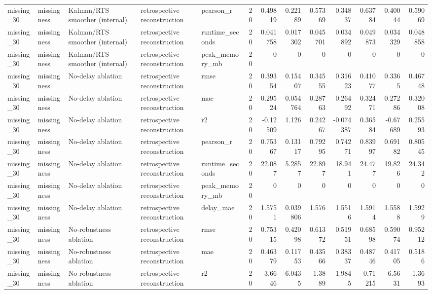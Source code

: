 \begin{table}[!htbp]
{{\begin{tabular}{lllllrrrrrrrr}
missing_30 & missingness & Kalman/RTS smoother (internal) & retrospective reconstruction & pearson_r & 20 & 0.49819 & 0.22189 & 0.57369 & 0.34837 & 0.63784 & 0.40044 & 0.59069 \\
missing_30 & missingness & Kalman/RTS smoother (internal) & retrospective reconstruction & runtime_seconds & 20 & 0.041758 & 0.017302 & 0.045701 & 0.034892 & 0.049873 & 0.034329 & 0.048858 \\
missing_30 & missingness & Kalman/RTS smoother (internal) & retrospective reconstruction & peak_memory_mb & 20 & 0 & 0 & 0 & 0 & 0 & 0 & 0 \\
missing_30 & missingness & No-delay ablation & retrospective reconstruction & rmse & 20 & 0.39354 & 0.15407 & 0.34555 & 0.31623 & 0.41077 & 0.3365 & 0.46748 \\
missing_30 & missingness & No-delay ablation & retrospective reconstruction & mae & 20 & 0.29524 & 0.054764 & 0.28763 & 0.26492 & 0.32471 & 0.27286 & 0.32008 \\
missing_30 & missingness & No-delay ablation & retrospective reconstruction & r2 & 20 & -0.12509 & 1.126 & 0.24267 & -0.074387 & 0.36584 & -0.67689 & 0.25593 \\
missing_30 & missingness & No-delay ablation & retrospective reconstruction & pearson_r & 20 & 0.75367 & 0.13117 & 0.79295 & 0.74271 & 0.83997 & 0.69182 & 0.80545 \\
missing_30 & missingness & No-delay ablation & retrospective reconstruction & runtime_seconds & 20 & 22.087 & 5.2857 & 22.897 & 18.941 & 24.477 & 19.826 & 24.342 \\
missing_30 & missingness & No-delay ablation & retrospective reconstruction & peak_memory_mb & 20 & 0 & 0 & 0 & 0 & 0 & 0 & 0 \\
missing_30 & missingness & No-delay ablation & retrospective reconstruction & delay_mae & 20 & 1.5751 & 0.039806 & 1.576 & 1.5516 & 1.5914 & 1.5588 & 1.5929 \\
missing_30 & missingness & No-robustness ablation & retrospective reconstruction & rmse & 20 & 0.75315 & 0.42098 & 0.61372 & 0.51951 & 0.68598 & 0.59074 & 0.95212 \\
missing_30 & missingness & No-robustness ablation & retrospective reconstruction & mae & 20 & 0.46379 & 0.11753 & 0.43566 & 0.38337 & 0.48746 & 0.41705 & 0.5186 \\
missing_30 & missingness & No-robustness ablation & retrospective reconstruction & r2 & 20 & -3.6646 & 6.0435 & -1.3889 & -1.9845 & -0.71215 & -6.5631 & -1.3693 \\

\end{tabular}}}
\end{table}
